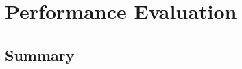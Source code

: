\chapter{Performance Evaluation}

    \graphicspath{{Chapter6-Results/Figs/Vector/}{Chapter6-Results/Figs/}}


\section{Summary}